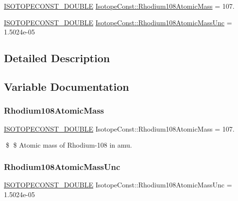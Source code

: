 \begin{DoxyCompactItemize}
\item 
\mbox{\hyperlink{group___isotope_const-_macros_ga8f45a7272ce02c0b4c65c44636ed719a}{I\+S\+O\+T\+O\+P\+E\+C\+O\+N\+S\+T\+\_\+\+D\+O\+U\+B\+LE}} \mbox{\hyperlink{group___isotope_const-_rhodium-_rh108_ga3eecc3b689cb44b740bd79771e468ee7}{Isotope\+Const\+::\+Rhodium108\+Atomic\+Mass}} = 107.
\item 
\mbox{\hyperlink{group___isotope_const-_macros_ga8f45a7272ce02c0b4c65c44636ed719a}{I\+S\+O\+T\+O\+P\+E\+C\+O\+N\+S\+T\+\_\+\+D\+O\+U\+B\+LE}} \mbox{\hyperlink{group___isotope_const-_rhodium-_rh108_ga99b78c9ac13d48ae9e34977a6acd0f6f}{Isotope\+Const\+::\+Rhodium108\+Atomic\+Mass\+Unc}} = 1.\+5024e-\/05
\end{DoxyCompactItemize}


\subsection{Detailed Description}


\subsection{Variable Documentation}
\mbox{\label{group___isotope_const-_rhodium-_rh108_ga3eecc3b689cb44b740bd79771e468ee7}} 
\subsubsection{\texorpdfstring{Rhodium108\+Atomic\+Mass}{Rhodium108AtomicMass}}
{\footnotesize\ttfamily \mbox{\hyperlink{group___isotope_const-_macros_ga8f45a7272ce02c0b4c65c44636ed719a}{I\+S\+O\+T\+O\+P\+E\+C\+O\+N\+S\+T\+\_\+\+D\+O\+U\+B\+LE}} Isotope\+Const\+::\+Rhodium108\+Atomic\+Mass = 107.}

\$ \$ Atomic mass of Rhodium-\/108 in amu. \mbox{\label{group___isotope_const-_rhodium-_rh108_ga99b78c9ac13d48ae9e34977a6acd0f6f}} 
\subsubsection{\texorpdfstring{Rhodium108\+Atomic\+Mass\+Unc}{Rhodium108AtomicMassUnc}}
{\footnotesize\ttfamily \mbox{\hyperlink{group___isotope_const-_macros_ga8f45a7272ce02c0b4c65c44636ed719a}{I\+S\+O\+T\+O\+P\+E\+C\+O\+N\+S\+T\+\_\+\+D\+O\+U\+B\+LE}} Isotope\+Const\+::\+Rhodium108\+Atomic\+Mass\+Unc = 1.\+5024e-\/05}

